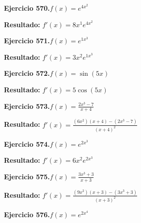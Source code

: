 \documentclass[10pt,a4paper]{article}
\begin{document}
\begin{ejbox}
\textbf{Ejercicio 570.}\quad $f(x) = e^{4x^{2}}$
\end{ejbox}

\begin{solbox}
\textbf{Resultado:} \(\displaystyle f'(x) = 8x^{1}e^{4x^{2}}\)
\end{solbox}

\newpage
\begin{ejbox}
\textbf{Ejercicio 571.}\quad $f(x) = e^{1x^{3}}$
\end{ejbox}

\begin{solbox}
\textbf{Resultado:} \(\displaystyle f'(x) = 3x^{2}e^{1x^{3}}\)
\end{solbox}

\begin{ejbox}
\textbf{Ejercicio 572.}\quad $f(x) = \sin(5x)$
\end{ejbox}

\begin{solbox}
\textbf{Resultado:} \(\displaystyle f'(x) = 5\cos(5x)\)
\end{solbox}

\begin{ejbox}
\textbf{Ejercicio 573.}\quad $f(x) = \frac{2x^{3} -7}{x + 4}$
\end{ejbox}

\begin{solbox}
\textbf{Resultado:} \(\displaystyle f'(x) = \frac{(6x^{2})(x+4) - (2x^{3} -7)}{(x+4)^2}\)
\end{solbox}

\newpage
\begin{ejbox}
\textbf{Ejercicio 574.}\quad $f(x) = e^{2x^{3}}$
\end{ejbox}

\begin{solbox}
\textbf{Resultado:} \(\displaystyle f'(x) = 6x^{2}e^{2x^{3}}\)
\end{solbox}

\begin{ejbox}
\textbf{Ejercicio 575.}\quad $f(x) = \frac{3x^{3} +3}{x + 3}$
\end{ejbox}

\begin{solbox}
\textbf{Resultado:} \(\displaystyle f'(x) = \frac{(9x^{2})(x+3) - (3x^{3} +3)}{(x+3)^2}\)
\end{solbox}

\begin{ejbox}
\textbf{Ejercicio 576.}\quad $f(x) = e^{2x^{4}}$
\end{ejbox}
\end{document}
